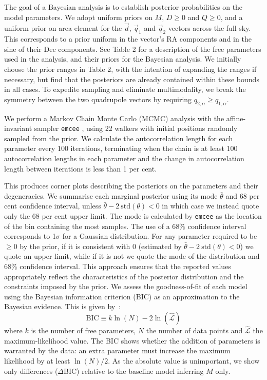 \documentclass[fleqn,usenatbib,nofootinbib]{mnras}
\newcommand{\hd}[1]{{\color{red}\textbf{HD: #1}}}
\begin{document}
The goal of a Bayesian analysis is to establish posterior probabilities on the model parameters. We adopt uniform priors on $M$, $D\ge0$ and $Q\ge0$,
and a uniform prior on area element for the $\vec{d}$, $\vec{q}_1$ and $\vec{q}_2$ vectors across the full sky. This corresponds to a prior uniform in the vector's RA components
and in the sine of their Dec components.
See Table 2 for a description of the free parameters used in the analysis, and their priors for the Bayesian analysis.
We initially choose the prior ranges in Table 2, with the intention of expanding the ranges if necessary, but find that the posteriors are already contained within these bounds in all cases.
To expedite sampling and eliminate multimodality, we break the symmetry between the two quadrupole vectors by requiring $q_{2,\alpha} \ge q_{1,\alpha}$.

We perform a Markov Chain Monte Carlo (MCMC) analysis with the affine-invariant sampler \texttt{emcee} \citep{emcee}, using 22 walkers with initial positions randomly sampled from the prior. We calculate the autocorrelation length for each parameter every 100 iterations, terminating when the chain is at least 100 autocorrelation lengths in each parameter and the change in autocorrelation length between iterations is less than 1 per cent.


This produces corner plots describing the posteriors on the parameters and their degeneracies. We summarise each marginal posterior using its mode $\bar{\theta}$ and 68 per cent confidence interval,
unless $\bar{\theta}-2\:\text{std}(\theta)<0$ in which case we instead quote only the 68 per cent upper limit. The mode is calculated by \texttt{emcee} as the location of the bin containing the most samples. The use of a 68$\%$ confidence interval corresponds to 1$\sigma$ for a Gaussian distribution. For any parameter required to be $\geq 0$ by the prior, if it is consistent with 0 (estimated by  $\bar{\theta}-2\:\text{std}(\theta)<0$) we quote an upper limit, while if it is not we quote the mode of the distribution and 68\% confidence interval. This approach ensures that the reported values appropriately reflect the characteristics of the posterior distribution and the constraints imposed by the prior. We assess the goodness-of-fit of each model using the Bayesian information criterion (BIC) as an approximation to the Bayesian evidence. This is given by~\citet{BIC}:
\begin{equation}
\text{BIC} \equiv k\ln(N) - 2\ln(\hat{\mathcal{L}})
\end{equation}
where $k$ is the number of free parameters, $N$ the number of data points and $\hat{\mathcal{L}}$ the maximum-likelihood value. The BIC shows whether the addition of parameters is warranted by the data: an extra parameter must increase the maximum likelihood by at least $\ln(N)/2$. As the absolute value is unimportant, we show only differences ($\Delta$BIC) relative to the baseline model inferring $M$ only.
\end{document}
